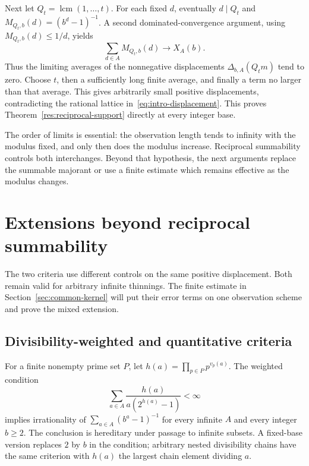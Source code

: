 \documentclass[11pt]{article}
\begin{document}
Next let $Q_t=\operatorname{lcm}(1,\ldots,t)$.
For each fixed $d$, eventually $d\mid Q_t$ and
$M_{Q_t,b}(d)=(b^d-1)^{-1}$.  A second dominated-convergence argument,
using $M_{Q_t,b}(d)\le1/d$, yields
\begin{equation}
 \sum_{d\in A}M_{Q_t,b}(d)\longrightarrow X_A(b).
 \label{eq:lcm-prefix-orbit-limit}
\end{equation}
Thus the limiting averages of the nonnegative displacements
$\Delta_{b,A}(Q_tm)$ tend to zero.  Choose $t$, then a sufficiently long
finite average, and finally a term no larger than that average.
This gives arbitrarily small positive displacements, contradicting the
rational lattice in~\eqref{eq:intro-displacement}.  This proves
Theorem~\ref{res:reciprocal-support} directly at every integer base.

The order of limits is essential: the observation length tends to infinity
with the modulus fixed, and only then does the modulus increase.
Reciprocal summability controls both interchanges.  Beyond that hypothesis,
the next arguments replace the summable majorant or use a finite estimate
which remains effective as the modulus changes.

\section{Extensions beyond reciprocal summability}
\label{sec:eight-return-extensions}

The two criteria use different controls on the same positive displacement.
Both remain valid for arbitrary infinite thinnings.  The finite estimate
in Section~\ref{sec:common-kernel} will put their error terms on one
observation scheme and prove the mixed extension.

\subsection{Divisibility-weighted and quantitative criteria}
For a finite nonempty prime set $P$, let
$h(a)=\prod_{p\in P}p^{v_p(a)}$.  The weighted condition
\[
  \sum_{a\in A}\frac{h(a)}{a(2^{h(a)}-1)}<\infty
  \tag{W}\label{eq:weighted-return}
\]
implies irrationality of $\sum_{a\in A}(b^a-1)^{-1}$ for every infinite
$A$ and every integer $b\ge2$.  The conclusion is hereditary under passage
to infinite subsets.  A fixed-base version replaces $2$ by $b$ in the
condition; arbitrary nested divisibility chains have the same criterion
with $h(a)$ the largest chain element dividing $a$.
\end{document}
